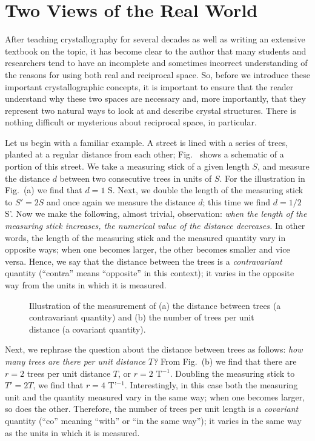 \section{Two Views of the Real World}
After teaching crystallography for several decades as well as writing an extensive textbook on the topic, it has become clear to the author that many students and researchers tend to have an incomplete and sometimes incorrect understanding of the reasons for using both real and reciprocal space.  So, before we introduce these important crystallographic concepts, it is important to ensure that the reader understand why these two spaces are necessary and, more importantly, that they represent two natural ways to look at and describe crystal structures.  There is nothing difficult or mysterious about reciprocal space, in particular.

Let us begin with a familiar example.  A street is lined with a series of trees, planted at a regular distance from each other;  Fig.~ shows a schematic of a portion of this street.  We take a measuring stick of a given length $S$, and measure the distance $d$ between two consecutive trees in units of $S$.  For the illustration in Fig.~(a) we find that $d=1$ S.  Next, we double the length of the measuring stick to $S'=2S$ and once again we measure the distance $d$; this time we find $d = 1/2$ S'.  Now we make the following, almost trivial, observation: \textit{when the length of the measuring stick increases, the numerical value of the distance decreases.} In other words, the length of the measuring stick and the measured quantity vary in opposite ways; when one becomes larger, the other becomes smaller and vice versa.  Hence, we say that the distance between the trees is a \textit{contravariant} quantity (``contra'' means ``opposite'' in this context); it varies in the opposite way from the units in which it is measured.

\begin{wrapfigure}{r}{0.3\textwidth}
  \centering\leavevmode
\caption{\small Illustration of the measurement of (a) the distance between trees (a contravariant quantity) and (b) the number of trees per unit distance (a covariant quantity).}
\end{wrapfigure}

Next, we rephrase the question about the distance between trees as follows: \textit{how many trees are there per unit distance $T$?}  From Fig.~(b) we find that there are $r=2$ trees per unit distance $T$, or $r=2$ T$^{-1}$.  Doubling the measuring stick to $T'=2T$, we find that $r=4$ T'$^{-1}$.  Interestingly, in this case both the measuring unit and the quantity measured vary in the same way; when one becomes larger, so does the other.  Therefore, the number of trees per unit length is a \textit{covariant} quantity (``co'' meaning ``with'' or ``in the same way''); it varies in the same way as the units in which it is measured.


